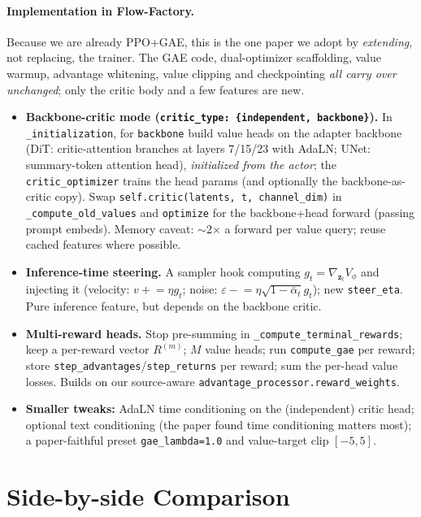 \documentclass[11pt]{article}
\theoremstyle{remark}
\newcommand{\zt}{\bm{z}}
\newcommand{\Vphi}{V_\phi}
\begin{document}
\paragraph{Implementation in Flow-Factory.}
Because we are already PPO+GAE, this is the one paper we adopt by \emph{extending}, not
replacing, the trainer. The GAE code, dual-optimizer scaffolding, value warmup,
advantage whitening, value clipping and checkpointing \emph{all carry over unchanged};
only the critic body and a few features are new.
\begin{itemize}[leftmargin=1.6em]
  \item \textbf{Backbone-critic mode (\texttt{critic\_type: \{independent, backbone\}}).}
  In \texttt{\_initialization}, for \texttt{backbone} build value heads on the adapter
  backbone (DiT: critic-attention branches at layers 7/15/23 with AdaLN; UNet:
  summary-token attention head), \emph{initialized from the actor}; the
  \texttt{critic\_optimizer} trains the head params (and optionally the backbone-as-critic
  copy). Swap \texttt{self.critic(latents, t, channel\_dim)} in
  \texttt{\_compute\_old\_values} and \texttt{optimize} for the backbone+head forward
  (passing prompt embeds). Memory caveat: $\sim$2$\times$ a forward per value query;
  reuse cached features where possible.
  \item \textbf{Inference-time steering.} A sampler hook computing
  $g_t=\nabla_{\zt_t}\Vphi$ and injecting it (velocity: $v\mathrel{+}=\eta g_t$; noise:
  $\varepsilon\mathrel{-}=\eta\sqrt{1-\bar\alpha_t}g_t$); new \texttt{steer\_eta}. Pure
  inference feature, but depends on the backbone critic.
  \item \textbf{Multi-reward heads.} Stop pre-summing in
  \texttt{\_compute\_terminal\_rewards}; keep a per-reward vector $R^{(m)}$; $M$ value
  heads; run \texttt{compute\_gae} per reward; store
  \texttt{step\_advantages}/\texttt{step\_returns} per reward; sum the per-head value
  losses. Builds on our source-aware \texttt{advantage\_processor.reward\_weights}.
  \item \textbf{Smaller tweaks:} AdaLN time conditioning on the (independent) critic
  head; optional text conditioning (the paper found time conditioning matters most);
  a paper-faithful preset \texttt{gae\_lambda=1.0} and value-target clip $[-5,5]$.
\end{itemize}

\section{Side-by-side Comparison}
\label{sec:tables}
\end{document}
